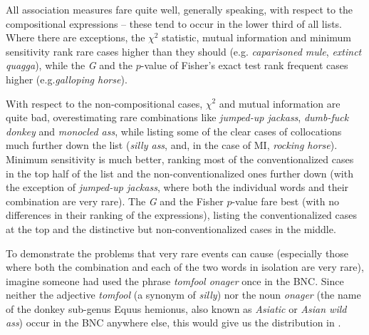 All association  measures  fare quite well, generally speaking, with respect to the compositional  expressions -- these tend to occur in the lower third of all lists. Where there are exceptions, the $\chi^2$ statistic,  mutual information  and minimum sensitivity  rank rare cases higher than they should (e.g. \textit{caparisoned mule}, \textit{extinct quagga}), while the \emph{G}  and the $p$-value of Fisher's exact test  rank frequent cases higher (e.g.\textit{galloping horse}).

With respect to the non\hyp{}compositional  cases, $\chi^2$  and mutual information  are quite bad, overestimating rare combinations like \textit{jumped\hyp{}up jackass}, \textit{dumb\hyp{}fuck donkey} and \textit{monocled ass}, while listing some of the clear cases of collocations  much further down the list (\textit{silly ass}, and, in the case of MI, \textit{rocking horse}). Minimum sensitivity  is much better, ranking most of the conventionalized  cases in the top half of the list and the non\hyp{}conventionalized ones further down (with the exception of \textit{jumped\hyp{}up jackass}, where both the individual words and their combination are very rare). The \emph{G}  and the Fisher  $p$-value fare best (with no differences in their ranking of the expressions), listing the conventionalized  cases at the top and the distinctive but non\hyp{}conventionalized cases in the middle.

To demonstrate the problems that very rare events can cause (especially those where both the combination and each of the two words in isolation are very rare), imagine someone had used the phrase \textit{tomfool onager} once in the BNC.  Since neither the adjective  \textit{tomfool} (a synonym  of \textit{silly}) nor the noun  \textit{onager} (the name of the donkey sub\hyp{}genus Equus hemionus, also known as \textit{Asiatic} or \textit{Asian wild ass}) occur in the BNC  anywhere else, this would give us the distribution  in .


